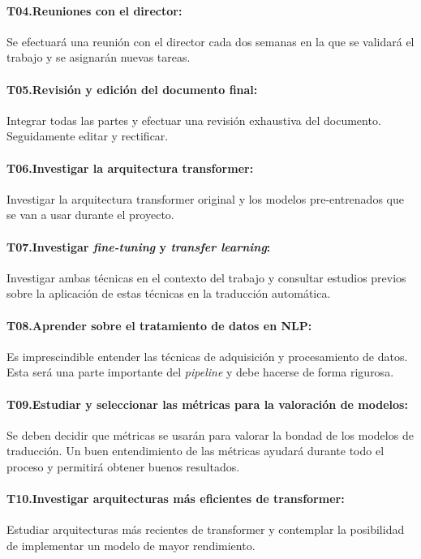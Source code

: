 \paragraph{T04.\quad Reuniones con el director:}\label{T04}
Se efectuará una reunión con el director cada dos semanas en la que se validará el trabajo
y se asignarán nuevas tareas.
\paragraph{T05.\quad Revisión y edición del documento final:}\label{T05}
Integrar todas las partes y efectuar una revisión exhaustiva del documento. Seguidamente
editar y rectificar.
\paragraph{T06.\quad Investigar la arquitectura transformer:}\label{T06}
Investigar la arquitectura transformer original y los modelos pre-entrenados que se van
a usar durante el proyecto.
\paragraph{T07.\quad Investigar \textit{fine-tuning} y \textit{transfer learning}:}\label{T07}
Investigar ambas técnicas en el contexto del trabajo y consultar estudios previos sobre
la aplicación de estas técnicas en la traducción automática.
\paragraph{T08.\quad Aprender sobre el tratamiento de datos en NLP:}\label{T08}
Es imprescindible entender las técnicas de adquisición y procesamiento de datos. Esta será
una parte importante del \textit{pipeline} y debe hacerse de forma rigurosa.
\paragraph{T09.\quad Estudiar y seleccionar las métricas para la valoración de modelos:}\label{T09}
Se deben decidir que métricas se usarán para valorar la bondad de los modelos de traducción.
Un buen entendimiento de las métricas ayudará durante todo el proceso y permitirá obtener
buenos resultados.
\paragraph{T10.\quad Investigar arquitecturas más eficientes de transformer:}\label{T10}
Estudiar arquitecturas más recientes de transformer y contemplar la posibilidad de
implementar un modelo de mayor rendimiento.
